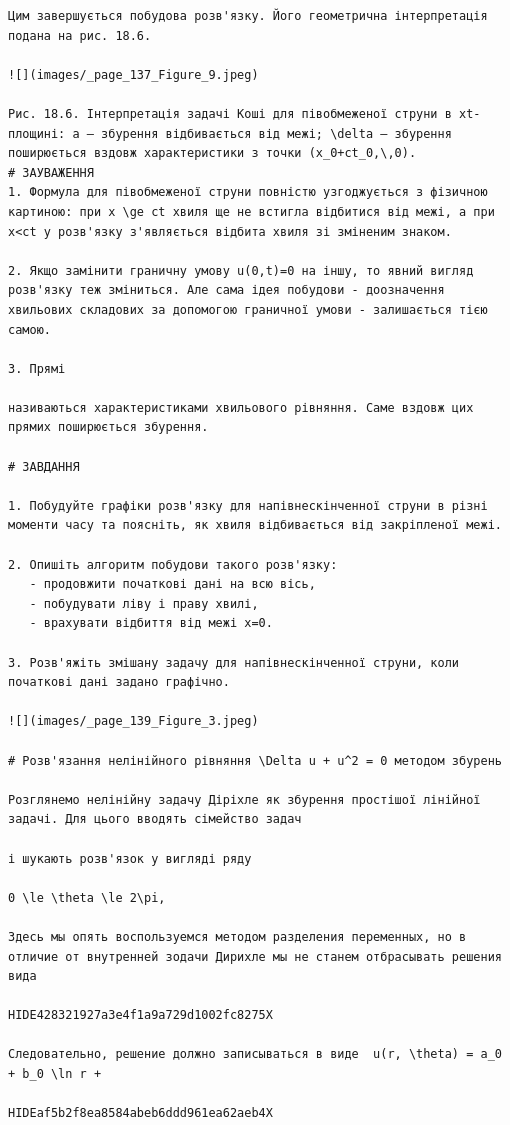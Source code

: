 \documentclass[
  ukrainian,
]{article}
\begin{document}
\begin{verbatim}
Цим завершується побудова розв'язку. Його геометрична інтерпретація подана на рис. 18.6.

![](images/_page_137_Figure_9.jpeg)

Рис. 18.6. Інтерпретація задачі Коші для півобмеженої струни в xt-площині: a — збурення відбивається від межі; \delta — збурення поширюється вздовж характеристики з точки (x_0+ct_0,\,0).
# ЗАУВАЖЕННЯ
1. Формула для півобмеженої струни повністю узгоджується з фізичною картиною: при x \ge ct хвиля ще не встигла відбитися від межі, а при x<ct у розв'язку з'являється відбита хвиля зі зміненим знаком.

2. Якщо замінити граничну умову u(0,t)=0 на іншу, то явний вигляд розв'язку теж зміниться. Але сама ідея побудови - доозначення хвильових складових за допомогою граничної умови - залишається тією самою.

3. Прямі

називаються характеристиками хвильового рівняння. Саме вздовж цих прямих поширюється збурення.

# ЗАВДАННЯ

1. Побудуйте графіки розв'язку для напівнескінченної струни в різні моменти часу та поясніть, як хвиля відбивається від закріпленої межі.

2. Опишіть алгоритм побудови такого розв'язку:
   - продовжити початкові дані на всю вісь,
   - побудувати ліву і праву хвилі,
   - врахувати відбиття від межі x=0.

3. Розв'яжіть змішану задачу для напівнескінченної струни, коли початкові дані задано графічно.

![](images/_page_139_Figure_3.jpeg)

# Розв'язання нелінійного рівняння \Delta u + u^2 = 0 методом збурень

Розглянемо нелінійну задачу Діріхле як збурення простішої лінійної задачі. Для цього вводять сімейство задач

і шукають розв'язок у вигляді ряду

0 \le \theta \le 2\pi, 

Здесь мы опять воспользуемся методом разделения переменных, но в отличие от внутренней зодачи Дирихле мы не станем отбрасывать решения вида

HIDE428321927a3e4f1a9a729d1002fc8275X

Следовательно, решение должно записываться в виде  u(r, \theta) = a_0 + b_0 \ln r + 

HIDEaf5b2f8ea8584abeb6ddd961ea62aeb4X


\end{verbatim}
\end{document}
